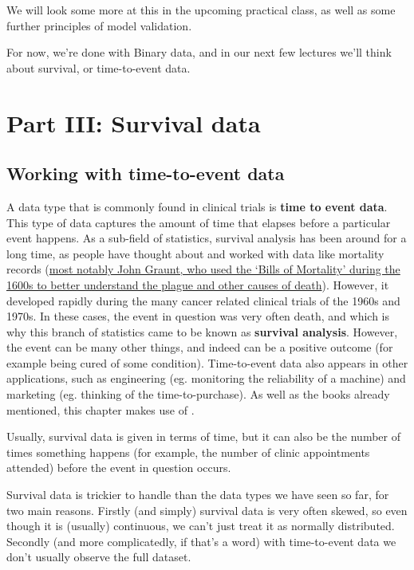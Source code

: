 \documentclass[
  openany]{book}
\theoremstyle{definition}
\theoremstyle{definition}
\theoremstyle{definition}
\theoremstyle{definition}
\theoremstyle{remark}
\begin{document}
We will look some more at this in the upcoming practical class, as well as some further principles of model validation.

For now, we're done with Binary data, and in our next few lectures we'll think about survival, or time-to-event data.

\part{Part III: Survival data}\label{part-part-iii-survival-data}

\chapter{Working with time-to-event data}\label{working-with-time-to-event-data}

A data type that is commonly found in clinical trials is \textbf{time to event data}. This type of data captures the amount of time that elapses before a particular event happens. As a sub-field of statistics, survival analysis has been around for a long time, as people have thought about and worked with data like mortality records (\href{https://rss.onlinelibrary.wiley.com/doi/full/10.1111/1740-9713.01421}{most notably John Graunt, who used the `Bills of Mortality' during the 1600s to better understand the plague and other causes of death}). However, it developed rapidly during the many cancer related clinical trials of the 1960s and 1970s. In these cases, the event in question was very often death, and which is why this branch of statistics came to be known as \textbf{survival analysis}. However, the event can be many other things, and indeed can be a positive outcome (for example being cured of some condition). Time-to-event data also appears in other applications, such as engineering (eg. monitoring the reliability of a machine) and marketing (eg. thinking of the time-to-purchase). As well as the books already mentioned, this chapter makes use of \citet{collett_surv}.

Usually, survival data is given in terms of time, but it can also be the number of times something happens (for example, the number of clinic appointments attended) before the event in question occurs.

Survival data is trickier to handle than the data types we have seen so far, for two main reasons. Firstly (and simply) survival data is very often skewed, so even though it is (usually) continuous, we can't just treat it as normally distributed. Secondly (and more complicatedly, if that's a word) with time-to-event data we don't usually observe the full dataset.
\end{document}
